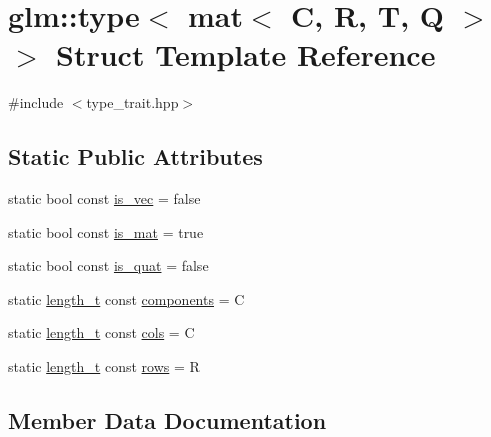 \hypertarget{structglm_1_1type_3_01mat_3_01_c_00_01_r_00_01_t_00_01_q_01_4_01_4}{}\section{glm\+:\+:type$<$ mat$<$ C, R, T, Q $>$ $>$ Struct Template Reference}
\label{structglm_1_1type_3_01mat_3_01_c_00_01_r_00_01_t_00_01_q_01_4_01_4}


{\ttfamily \#include $<$type\+\_\+trait.\+hpp$>$}

\subsection*{Static Public Attributes}
\begin{DoxyCompactItemize}
\item 
static bool const \hyperlink{structglm_1_1type_3_01mat_3_01_c_00_01_r_00_01_t_00_01_q_01_4_01_4_a6f4a616eae7863364fa05ed42d0d90c9}{is\+\_\+vec} = false
\item 
static bool const \hyperlink{structglm_1_1type_3_01mat_3_01_c_00_01_r_00_01_t_00_01_q_01_4_01_4_a8fb529c47b93fcd9c446bb960d6e1fc9}{is\+\_\+mat} = true
\item 
static bool const \hyperlink{structglm_1_1type_3_01mat_3_01_c_00_01_r_00_01_t_00_01_q_01_4_01_4_ab9f23373d46f9d066cd6274c79d0527f}{is\+\_\+quat} = false
\item 
static \hyperlink{namespaceglm_a090a0de2260835bee80e71a702492ed9}{length\+\_\+t} const \hyperlink{structglm_1_1type_3_01mat_3_01_c_00_01_r_00_01_t_00_01_q_01_4_01_4_a4f440364136d8fa3a62b2e1bfff81a01}{components} = C
\item 
static \hyperlink{namespaceglm_a090a0de2260835bee80e71a702492ed9}{length\+\_\+t} const \hyperlink{structglm_1_1type_3_01mat_3_01_c_00_01_r_00_01_t_00_01_q_01_4_01_4_a9be28abe8d17849b7a6cd499e8982996}{cols} = C
\item 
static \hyperlink{namespaceglm_a090a0de2260835bee80e71a702492ed9}{length\+\_\+t} const \hyperlink{structglm_1_1type_3_01mat_3_01_c_00_01_r_00_01_t_00_01_q_01_4_01_4_a638d8b45554f37be410a7275a744f875}{rows} = R
\end{DoxyCompactItemize}


\subsection{Member Data Documentation}
\mbox{\label{structglm_1_1type_3_01mat_3_01_c_00_01_r_00_01_t_00_01_q_01_4_01_4_a9be28abe8d17849b7a6cd499e8982996}} 
